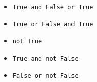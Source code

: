 \begin{exercice_cours}{}

\begin{itemize}
	\item \verb|True and False or True| \dotfill
	\item \verb|True or False and True| \dotfill
	\item \verb|not True| \dotfill
	\item \verb|True and not False| \dotfill
	\item \verb|False or not False| \dotfill
\end{itemize}
\end{exercice_cours}